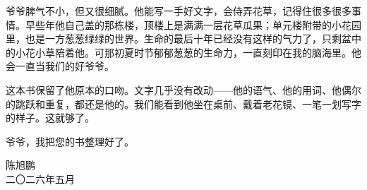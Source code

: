 爷爷脾气不小，但又很细腻。他能写一手好文字，会侍弄花草，记得住很多很多事情。早些年他自己盖的那栋楼，顶楼上是满满一层花草瓜果；单元楼附带的小花园里，也是一方葱葱绿绿的世界。生命的最后十年已经没有这样的气力了，只剩盆中的小花小草陪着他。可那初夏时节郁郁葱葱的生命力，一直刻印在我的脑海里。他会一直当我们的好爷爷。

这本书保留了他原本的口吻。文字几乎没有改动——他的语气、他的用词、他偶尔的跳跃和重复，都还是他的。我们能看到他坐在桌前、戴着老花镜、一笔一划写字的样子。这就够了。

爷爷，我把您的书整理好了。
\nopagebreak

\vspace{1.6em}
\nopagebreak
\noindent\hfill\begin{minipage}{0.42\textwidth}\begin{flushright}
{\bookkai 陈旭鹏}\\[2pt]
{\bookkai\small 二〇二六年五月}
\end{flushright}\end{minipage}
